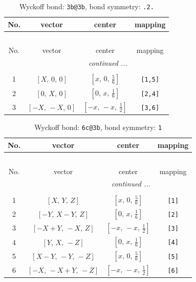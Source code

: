 \documentclass[fleqn,8pt]{jsarticle}
\begin{document}
\renewcommand{\arraystretch}{1.2}
\begin{longtable}{cccc}
\caption{Wyckoff bond: {\tt 3b@3b}, bond symmetry: {\tt .2.}}
 \\
 \hline \hline
No. & vector & center & mapping \\ \hline \endfirsthead

\multicolumn{3}{l}{\tablename\ \thetable{}} \\
 \hline \hline
No. & vector & center & mapping \\ \hline \endhead

 \hline \hline
\multicolumn{3}{r}{\footnotesize\it continued ...} \\ \endfoot

 \hline \hline
\multicolumn{3}{r}{} \\ \endlastfoot

1 & $\left[ X,\, 0,\, 0 \right]$ & $\left[ x,\, 0,\, \frac{5}{6} \right]$ & {\tt [1,5]} \\ \hline
2 & $\left[ 0,\, X,\, 0 \right]$ & $\left[ 0,\, x,\, \frac{1}{6} \right]$ & {\tt [2,4]} \\ \hline
3 & $\left[ - X,\, - X,\, 0 \right]$ & $\left[ - x,\, - x,\, \frac{1}{2} \right]$ & {\tt [3,6]} \\
\end{longtable}
\renewcommand{\arraystretch}{1.2}
\begin{longtable}{cccc}
\caption{Wyckoff bond: {\tt 6c@3b}, bond symmetry: {\tt 1}}
 \\
 \hline \hline
No. & vector & center & mapping \\ \hline \endfirsthead

\multicolumn{3}{l}{\tablename\ \thetable{}} \\
 \hline \hline
No. & vector & center & mapping \\ \hline \endhead

 \hline \hline
\multicolumn{3}{r}{\footnotesize\it continued ...} \\ \endfoot

 \hline \hline
\multicolumn{3}{r}{} \\ \endlastfoot

1 & $\left[ X,\, Y,\, Z \right]$ & $\left[ x,\, 0,\, \frac{5}{6} \right]$ & {\tt [1]} \\ \hline
2 & $\left[ - Y,\, X - Y,\, Z \right]$ & $\left[ 0,\, x,\, \frac{1}{6} \right]$ & {\tt [2]} \\ \hline
3 & $\left[ - X + Y,\, - X,\, Z \right]$ & $\left[ - x,\, - x,\, \frac{1}{2} \right]$ & {\tt [3]} \\ \hline
4 & $\left[ Y,\, X,\, - Z \right]$ & $\left[ 0,\, x,\, \frac{1}{6} \right]$ & {\tt [4]} \\ \hline
5 & $\left[ X - Y,\, - Y,\, - Z \right]$ & $\left[ x,\, 0,\, \frac{5}{6} \right]$ & {\tt [5]} \\ \hline
6 & $\left[ - X,\, - X + Y,\, - Z \right]$ & $\left[ - x,\, - x,\, \frac{1}{2} \right]$ & {\tt [6]} \\
\end{longtable}
\end{document}
